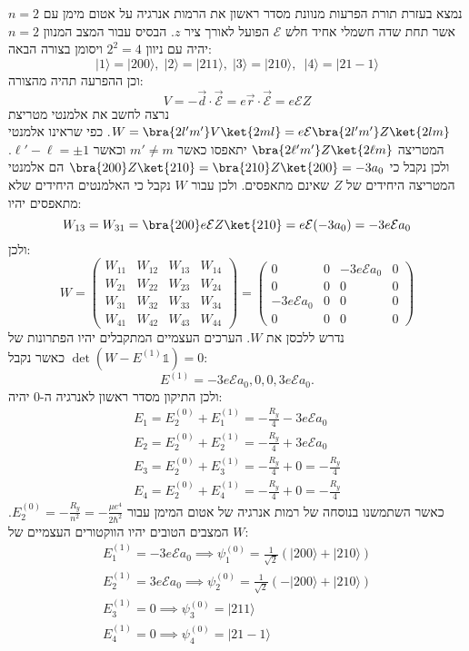 \documentclass{tstextbook}
\begin{document}
\begin{example}
נמצא בעזרת תורת הפרעות מנוונת מסדר ראשון את הרמות אנרגיה על אטום מימן עם \(n=2\) אשר תחת שדה חשמלי אחיד חלש \(\mathcal{E}\) הפועל לאורך ציר \(z\). הבסיס עבור המצב המנוון \(n=2\) יהיה עם ניוון \(2^{2}=4\) ויסומן בצורה הבאה:
$$|1\rangle=|200\rangle,\;|2\rangle=|211\rangle,\;|3\rangle=|210\rangle,\;\ |4\rangle=|21-1\rangle$$
וכן ההפרעה תהיה מהצורה:
$$V=-\vec{d}\cdot\vec{\mathcal{E}}=e\vec{r}\cdot\vec{\mathcal{E}}=e\mathcal{E}Z$$
נרצה לחשב את אלמנטי מטריצת \(W=\bra{2l'm'}V\ket{2ml}=e\mathcal{E}\bra{2l'm'}Z\ket{2lm}\). כפי שראינו אלמנטי המטריצה \(\bra{2\ell'm'}Z\ket{2\ell m}\) יתאפסו כאשר \(m'\neq m\) וכאשר \(\ell'-\ell = \pm 1\). ולכן נקבל כי \(\bra{200}Z\ket{210} = \bra{210}Z\ket{200} = -3 a_0\) הם אלמנטי המטריצה היחידים של \(Z\) שאינם מתאפסים. ולכן עבור \(W\) נקבל כי האלמנטים היחידים שלא מתאפסים יהיו:
$$W_{13}=W_{31}=\bra{200}e\mathcal{E}Z\ket{210}=e\mathcal{E} (-3a_{0})=-3e\mathcal{E} a_{0}$$
ולכן:
$$W=\begin{pmatrix}W_{11}&W_{12}&W_{13}&W_{14}\\ W_{21}&W_{22}&W_{23}&W_{24}\\ W_{31}&W_{32}&W_{33}&W_{34}\\ W_{41}&W_{42}&W_{43}&W_{44}\end{pmatrix}=\begin{pmatrix}0&0&-3e\mathcal{E}a_{0}&0\\ 0&0&0&0\\ -3e\mathcal{E}a_{0}&0&0&0\\ 0&0&0&0\end{pmatrix}$$
נדרש ללכסן את \(W\). הערכים העצמיים המתקבלים יהיו הפתרונות של \(\det \left( W-E^{(1)}\mathbb{1} \right)=0\) כאשר נקבל:
$$E^{(1)}=-3e\mathcal{E}a_{0},0,0,3e\mathcal{E}a_{0}.$$
ולכן התיקון מסדר ראשון לאנרגיה ה-0 יהיה:
$$\begin{gather}E_{1}=E_{2}^{(0)}+E_{1}^{(1)}=-\frac{R_{y}}{4}-3e{\mathcal{E}}a_{0}\\ E_{2}=E_{2}^{(0)}+E_{2}^{(1)}=-\frac{R_{y}}{4}+3e{\mathcal E}a_{0}\\ E_{3}=E_{2}^{(0)}+E_{3}^{(1)}=-\frac{R_{y}}{4}+0=-\frac{R_{y}}{4}\\ E_{4}=E_{2}^{(0)}+E_{4}^{(1)}=-\frac{R_{y}}{4}+0=-\frac{R_{y}}{4}
\end{gather}$$
כאשר השתמשנו בנוסחה של רמות אנרגיה של אטום המימן עבור \(E_{2}^{(0)}=-\frac{R_{y}}{n^{2}}=-\frac{\mu e^{4}}{2\hbar^{2}}\). המצבים הטובים יהיו הווקטורים העצמיים של \(W\):
$$\begin{gather}E_{1}^{(1)}=-3e{\mathcal{E}}a_{0}\implies\psi_{1}^{(0)}={\frac{1}{\sqrt{2}}}\left( |200\rangle+|210\rangle \right)\\ E_{2}^{(1)}=3e{\mathcal E}a_{0}\implies\psi_{2}^{(0)}={\frac{1}{\sqrt2}}\left( -|200\rangle+|210\rangle \right)\\ E_{3}^{(1)}=0\implies\psi_{3}^{(0)}=|211\rangle\\ E_{4}^{(1)}=0\implies\psi_{4}^{(0)}=|21-1\rangle
\end{gather}$$

\end{example}
\end{document}
